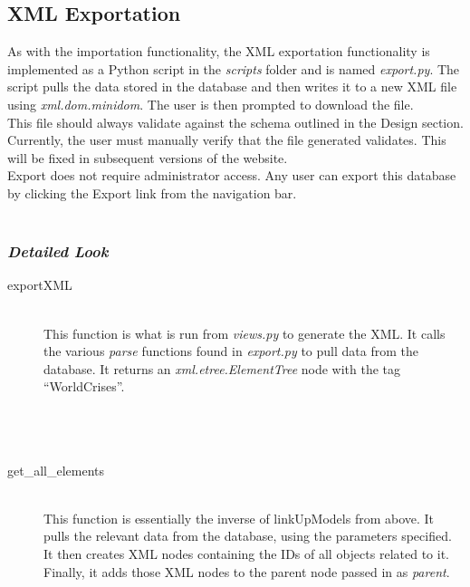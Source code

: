 \documentclass[12pt]{report}
\begin{document}
\subsection*{XML Exportation}
\hfill


As with the importation functionality, the XML exportation functionality is implemented as a Python script in the \emph{scripts} folder and is named \emph{export.py}.
The script pulls the data stored in the database and then writes it to a new XML file using \emph{xml.dom.minidom}.
The user is then prompted to download the file.\\

This file should always validate against the schema outlined in the Design section.
Currently, the user must manually verify that the file generated validates.
This will be fixed in subsequent versions of the website.\\

Export does not require administrator access.
Any user can export this database by clicking the Export link from the navigation bar.\\\\

\subsubsection*{\emph{Detailed Look}}
\begin{description}
    \item[exportXML] \hfill \\
        This function is what is run from \emph{views.py} to generate the XML.
        It calls the various \emph{parse} functions found in \emph{export.py} to pull data from the database.
        It returns an \emph{xml.etree.ElementTree} node with the tag ``WorldCrises''.\\\\\\\\
        
    \item[get\_all\_elements] \hfill \\
        This function is essentially the inverse of linkUpModels from above.
        It pulls the relevant data from the database, using the parameters specified.
        It then creates XML nodes containing the IDs of all objects related to it.
        Finally, it adds those XML nodes to the parent node passed in as \emph{parent}.\\
\end{description}
\end{document}
